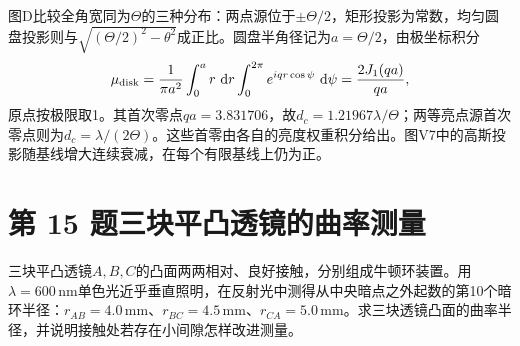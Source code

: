 \documentclass[UTF8,fontset=fandol,a4paper,11pt]{ctexart}
\newcommand{\dd}{\mathop{}\!\mathrm{d}}
\begin{document}
图D比较全角宽同为$\Theta$的三种分布：两点源位于$\pm\Theta/2$，矩形投影为常数，均匀圆盘投影则与$\sqrt{(\Theta/2)^2-\theta^2}$成正比。圆盘半角径记为$a=\Theta/2$，由极坐标积分
\[
\mu_{\rm disk}
=\frac1{\pi a^2}\int_0^a r\,\dd r\int_0^{2\pi}
 e^{iqr\cos\psi}\,\dd\psi
=\frac{2J_1(qa)}{qa},
\]
原点按极限取1。其首次零点$qa=3.831706$，故$d_c=1.21967\lambda/\Theta$；两等亮点源首次零点则为$d_c=\lambda/(2\Theta)$。这些首零由各自的亮度权重积分给出。图V7中的高斯投影随基线增大连续衰减，在每个有限基线上仍为正。





\section*{第 15 题\quad 三块平凸透镜的曲率测量}\label{q:15}

三块平凸透镜$A,B,C$的凸面两两相对、良好接触，分别组成牛顿环装置。用$\lambda=600\,\mathrm{nm}$单色光近乎垂直照明，在反射光中测得从中央暗点之外起数的第10个暗环半径：$r_{AB}=4.0\,\mathrm{mm}$、$r_{BC}=4.5\,\mathrm{mm}$、$r_{CA}=5.0\,\mathrm{mm}$。求三块透镜凸面的曲率半径，并说明接触处若存在小间隙怎样改进测量。
\end{document}
